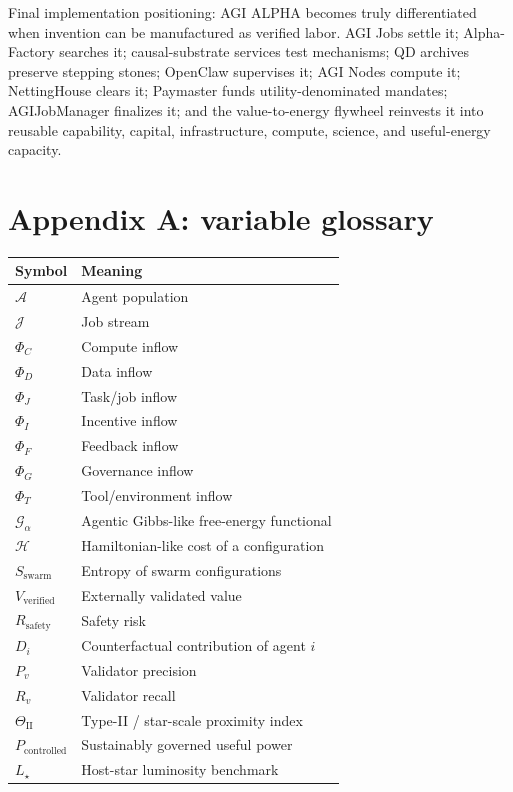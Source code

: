 \documentclass[
  11pt,
]{article}
\begin{document}
Final implementation positioning: AGI ALPHA becomes truly differentiated
when invention can be manufactured as verified labor. AGI Jobs settle
it; Alpha-Factory searches it; causal-substrate services test
mechanisms; QD archives preserve stepping stones; OpenClaw supervises
it; AGI Nodes compute it; NettingHouse clears it; Paymaster funds
utility-denominated mandates; AGIJobManager finalizes it; and the
value-to-energy flywheel reinvests it into reusable capability, capital,
infrastructure, compute, science, and useful-energy capacity.

\section{Appendix A: variable
glossary}\label{appendix-a-variable-glossary}

\begin{longtable}[]{@{}ll@{}}
\toprule\noalign{}
Symbol & Meaning \\
\midrule\noalign{}
\endhead
\bottomrule\noalign{}
\endlastfoot
\(\mathcal{A}\) & Agent population \\
\(\mathcal{J}\) & Job stream \\
\(\Phi_C\) & Compute inflow \\
\(\Phi_D\) & Data inflow \\
\(\Phi_J\) & Task/job inflow \\
\(\Phi_I\) & Incentive inflow \\
\(\Phi_F\) & Feedback inflow \\
\(\Phi_G\) & Governance inflow \\
\(\Phi_T\) & Tool/environment inflow \\
\(\mathcal{G}_{\alpha}\) & Agentic Gibbs-like free-energy functional \\
\(\mathcal{H}\) & Hamiltonian-like cost of a configuration \\
\(S_{\text{swarm}}\) & Entropy of swarm configurations \\
\(V_{\text{verified}}\) & Externally validated value \\
\(R_{\text{safety}}\) & Safety risk \\
\(D_i\) & Counterfactual contribution of agent \(i\) \\
\(P_v\) & Validator precision \\
\(R_v\) & Validator recall \\
\(\Theta_{\mathrm{II}}\) & Type-II / star-scale proximity index \\
\(P_{\text{controlled}}\) & Sustainably governed useful power \\
\(L_{\star}\) & Host-star luminosity benchmark \\
\end{longtable}
\end{document}
